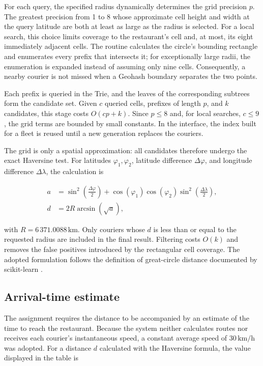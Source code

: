 \documentclass[12pt,a4paper]{article}
\begin{document}
For each query, the specified radius dynamically determines the grid precision
$p$. The greatest precision from 1 to 8 whose approximate cell height and width
at the query latitude are both at least as large as the radius is selected. For
a local search, this choice limits coverage to the
restaurant's cell and, at most, its eight immediately adjacent cells. The
routine calculates the circle's bounding rectangle and enumerates every prefix
that intersects it; for exceptionally large radii, the enumeration is expanded
instead of assuming only nine cells. Consequently, a nearby courier is not
missed when a Geohash boundary separates the two points.

Each prefix is queried in the Trie, and the leaves of the corresponding
subtrees form the candidate set. Given $c$ queried cells, prefixes of length
$p$, and $k$ candidates, this stage costs $O(cp+k)$. Since $p\leq 8$ and, for
local searches, $c\leq 9$, the grid terms are bounded by small constants. In
the interface, the index built for a fleet is reused until a new generation
replaces the couriers.

The grid is only a spatial approximation: all candidates therefore undergo the
exact Haversine test. For latitudes $\varphi_1,\varphi_2$, latitude difference
$\Delta\varphi$, and longitude difference $\Delta\lambda$, the calculation is

\begin{align}
a &= \sin^2\left(\frac{\Delta\varphi}{2}\right)
  + \cos(\varphi_1)\cos(\varphi_2)
    \sin^2\left(\frac{\Delta\lambda}{2}\right), \\
d &= 2R\arcsin(\sqrt{a}),
\end{align}

with $R=6\,371.0088\,\mathrm{km}$. Only couriers whose $d$ is less than or equal
to the requested radius are included in the final result. Filtering costs
$O(k)$ and removes the false positives introduced by the rectangular cell
coverage.
The adopted formulation follows the definition of great-circle distance
documented by scikit-learn \cite{haversine-sklearn}.

\subsection{Arrival-time estimate}

The assignment requires the distance to be accompanied by an estimate of the
time to reach the restaurant. Because the system neither calculates routes nor
receives each courier's instantaneous speed, a constant average speed of
$30\,\mathrm{km/h}$ was adopted. For a distance $d$ calculated with the
Haversine formula, the value displayed in the table is
\end{document}
